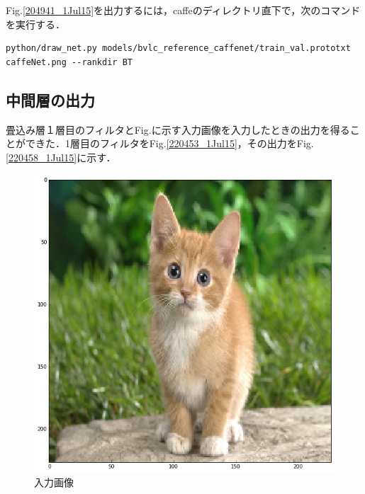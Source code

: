 \documentclass[a4paper,10pt]{jsarticle}
\begin{document}
Fig.\ref{204941_1Jul15}を出力するには，caffeのディレクトリ直下で，次のコマンドを実行する．
\begin{lstlisting}[basicstyle=\ttfamily\footnotesize, frame=single,breaklines = true]
python/draw_net.py models/bvlc_reference_caffenet/train_val.prototxt caffeNet.png --rankdir BT
\end{lstlisting}

\subsection{中間層の出力}
畳込み層１層目のフィルタとFig.に示す入力画像を入力したときの出力を得ることができた．1層目のフィルタをFig.\ref{220453_1Jul15}，その出力をFig.\ref{220458_1Jul15}に示す．
\begin{figure}[t]
 \centering
 \includegraphics[scale=0.5]{fig/png/input.png}
  \caption{入力画像}
\end{figure}
\end{document}
